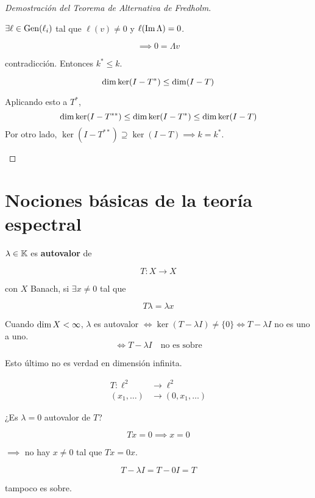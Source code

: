 \begin{proof}[Demostración del Teorema de Alternativa de Fredholm]
\begin{enumerate}[label=\alph*)]
      $\exists \ell \in \operatorname{Gen}(\ell_i)$ tal que $\ell(v)\neq 0$ y $\ell(\operatorname{Im} \Lambda)=0$.

      \[\implies 0=\Lambda v\]

      contradicción. Entonces $k^*\leq k$. 

      \[\operatorname{dim} \ker (I-T^*)\leq \operatorname{dim}(I-T)\]

      Aplicando esto a $T^*$, 
      \[\operatorname{dim}\ker (I-T^{**})\leq \dim\ker (I-T^*)\leq \operatorname{dim}\ker (I-T)\]
      Por otro lado, $\ker (I-T^{**})\supseteq \ker (I-T) \implies k=k^*$.
   \end{enumerate}
\end{proof}

\section{Nociones básicas de la teoría espectral}

\begin{fdefinition}
   $\lambda\in\mathbb{K}$ es \textbf{autovalor} de 

   \[T:X\to X\]

   con $X$ Banach, si $\exists x\neq 0$ tal que 

   \[T\lambda=\lambda x\]
\end{fdefinition}

\begin{fnote}
   Cuando $\operatorname{dim} X<\infty$, $\lambda$ es autovalor $\iff \ker (T-\lambda I)\neq \{0\}\iff T-\lambda I$ no es uno a uno.
   \[\iff T-\lambda I\quad\text{no es sobre}\]

   Esto último no es verdad en dimensión infinita.
\end{fnote}

\begin{fexample}
   \begin{align*}
      T:\ell^2&\to \ell^2\\
      (x_1,\ldots)&\to (0,x_1,\ldots)
   \end{align*}

   ¿Es $\lambda=0$ autovalor de $T$?

   \[Tx=0\implies x=0\]

   $\implies$ no hay $x\neq 0$ tal que $Tx=0x$.

   \[T-\lambda I=T-0I=T\]

   tampoco es sobre.
\end{fexample}

